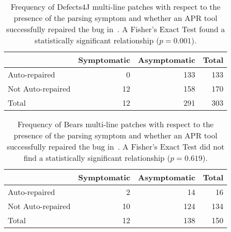 \begin{table}
{\begin{center}
	\begin{tabular}{l | rr | r}
            	\toprule
            	& Symptomatic & Asymptomatic & Total \\
            	\midrule
            	Auto-repaired & 0 & 133 & 133 \\
            	Not Auto-repaired & 12 & 158 & 170 \\
            	\midrule
            	Total & 12 & 291 & 303\\
            	\bottomrule
	\end{tabular}
 \end{center}
}
	\caption{Frequency of Defects4J multi-line patches with respect to the presence of
	the parsing symptom and whether an APR tool successfully
	repaired the bug in~\cite{durieux-repair-them-all}.
	A Fisher's Exact Test found a statistically significant relationship
	($p = 0.001$).}
	\label{tab:parsing-repair-frequencies-d4j}
\end{table}

\begin{table}
{\begin{center}
	\begin{tabular}{l | rr | r}
            	\toprule
            	& Symptomatic & Asymptomatic & Total \\
            	\midrule
            	Auto-repaired & 2 & 14 & 16 \\
            	Not Auto-repaired & 10 & 124 & 134 \\
            	\midrule
            	Total & 12 & 138 & 150\\
            	\bottomrule
	\end{tabular}
 \end{center}
}
	\caption{Frequency of Bears multi-line patches with respect to the presence of
	the parsing symptom and whether an APR tool successfully
	repaired the bug in~\cite{durieux-repair-them-all}.
	A Fisher's Exact Test did not find a statistically significant relationship
	($p = 0.619$).}
	\label{tab:parsing-repair-frequencies-bears}
\end{table}

